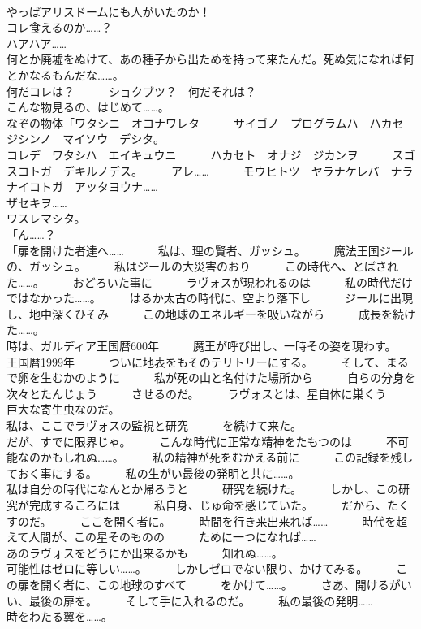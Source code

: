 \documentclass[8pt]{extreport}
\begin{document}
\begin{CJK}{UTF8}{min}
\\	やっぱアリスドームにも人がいたのか！	
\\	コレ食えるのか……？	
\\	ハアハア……	
\\	何とか廃墟をぬけて、あの種子から出ためを持って来たんだ。死ぬ気になれば何とかなるもんだな……。	
\\	何だコレは？　　　ショクブツ？　何だそれは？	
\\	こんな物見るの、はじめて……。	
\\	なぞの物体「ワタシニ　オコナワレタ　　　サイゴノ　プログラムハ　ハカセ　　　ジシンノ　マイソウ　デシタ。	
\\	コレデ　ワタシハ　エイキュウニ　　　ハカセト　オナジ　ジカンヲ　　　スゴスコトガ　デキルノデス。　　　アレ……　　　モウヒトツ　ヤラナケレバ　ナラ　　　ナイコトガ　アッタヨウナ……	
\\	ザセキヲ……	
\\	ワスレマシタ。	
\\	「ん……？ 
\\	「扉を開けた者達へ……　　　私は、理の賢者、ガッシュ。　　　魔法王国ジールの、ガッシュ。　　　私はジールの大災害のおり　　　この時代へ、とばされた……。　　　おどろいた事に　　　ラヴォスが現われるのは　　　私の時代だけではなかった……。　　　はるか太古の時代に、空より落下し　　　ジールに出現し、地中深くひそみ　　　この地球のエネルギーを吸いながら　　　成長を続けた……。	
\\	時は、ガルディア王国暦600年　　　魔王が呼び出し、一時その姿を現わす。　　　王国暦1999年　　　ついに地表をもそのテリトリーにする。　　　そして、まるで卵を生むかのように　　　私が死の山と名付けた場所から　　　自らの分身を次々とたんじょう　　　させるのだ。　　　ラヴォスとは、星自体に巣くう　　　巨大な寄生虫なのだ。	
\\	私は、ここでラヴォスの監視と研究　　　を続けて来た。	
\\	だが、すでに限界じゃ。　　　こんな時代に正常な精神をたもつのは　　　不可能なのかもしれぬ……。　　　私の精神が死をむかえる前に　　　この記録を残しておく事にする。　　　私の生がい最後の発明と共に……。	
\\	私は自分の時代になんとか帰ろうと　　　研究を続けた。　　　しかし、この研究が完成するころには　　　私自身、じゅ命を感じていた。　　　だから、たくすのだ。　　　ここを開く者に。　　　時間を行き来出来れば……　　　時代を超えて人間が、この星そのものの　　　ために一つになれば……	
\\	あのラヴォスをどうにか出来るかも　　　知れぬ……。	
\\	可能性はゼロに等しい……。　　　しかしゼロでない限り、かけてみる。　　　この扉を開く者に、この地球のすべて　　　をかけて……。　　　さあ、開けるがいい、最後の扉を。　　　そして手に入れるのだ。　　　私の最後の発明……　　　時をわたる翼を……。	

\end{CJK}
\end{document}
